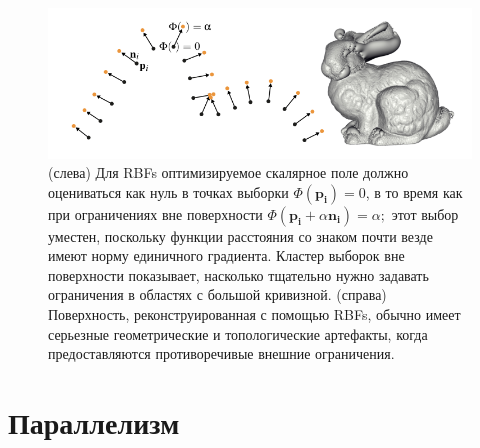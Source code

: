 \begin{figure}[h]
    \centering
    \includegraphics[scale=0.5]{images/4.png}
    \caption{(слева) Для RBFs оптимизируемое скалярное поле должно оцениваться как нуль в точках выборки $\Phi(\mathbf{p_i}) = 0$, в то время как при ограничениях вне поверхности $\Phi(\mathbf{p_i} + \alpha\mathbf{n_i}) = \alpha;$ этот выбор уместен, поскольку функции расстояния со знаком почти везде имеют норму единичного градиента. Кластер выборок вне поверхности показывает, насколько тщательно нужно задавать ограничения в областях с большой кривизной. (справа) Поверхность, реконструированная с помощью RBFs, обычно имеет серьезные геометрические и топологические артефакты, когда предоставляются противоречивые внешние ограничения.}
    \label{fig:4}
\end{figure}

\section{Параллелизм}

